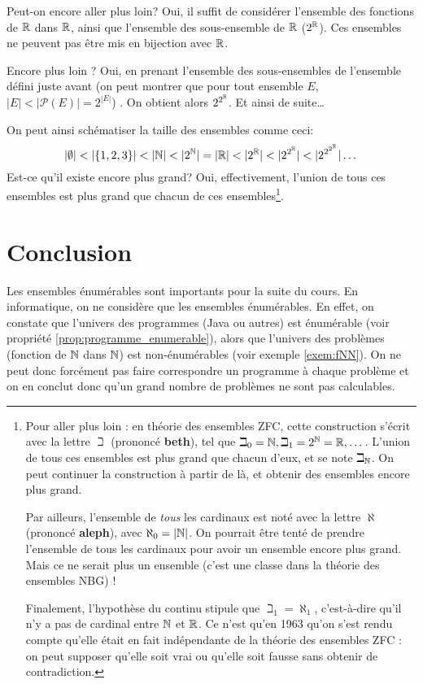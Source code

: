 Peut-on encore aller plus loin?  Oui,  il suffit de considérer  l'ensemble des fonctions de $\mathbb{R}$ dans $\mathbb{R}$, ainsi que
l'ensemble des sous-ensemble de $\mathbb{R}$ ($2^{\mathbb{R}}$).  Ces ensembles ne peuvent pas être mis en bijection avec $\mathbb{R}$.

Encore plus loin ?  Oui, en prenant l'ensemble des sous-ensembles de l'ensemble défini juste avant (on peut montrer que pour tout ensemble $E$, $|E|<|\mathcal{P}(E)|=2^{|E|}$) .  On obtient alors $2^{2^{\mathbb{R}}}$.  Et ainsi de suite\ldots

On peut ainsi schématiser la taille des ensembles comme ceci:
$$|\emptyset| < |\{1,2,3\}| < |\mathbb{N}| < |2^{\mathbb{N}}| = |\mathbb{R}| < |2^{\mathbb{R}}| < |2^{2^{\mathbb{R}}}| < |2^{2^{2^{\mathbb{R}}}}| \dots$$
Est-ce qu'il existe encore plus grand? Oui, effectivement, l'union de tous ces ensembles
est plus grand que chacun de ces ensembles\footnote{
Pour aller plus loin : en théorie des ensembles ZFC, cette construction s'écrit avec la lettre $\beth$ (prononcé \textbf{beth}), tel que $\beth_0 = \mathbb{N}, \beth_1 = 2^{\mathbb{N}} = \mathbb{R},\dots$. L'union de tous ces ensembles est plus grand que chacun d'eux, et se note $\beth_{\mathbb{N}}$. On peut continuer la construction à partir de là, et obtenir des ensembles encore plus grand.

Par ailleurs, l'ensemble de \emph{tous} les cardinaux est noté avec la lettre $\aleph$ (prononcé \textbf{aleph}), avec $\aleph_0 = \left\lvert\mathbb{N}\right\lvert$. On pourrait être tenté de prendre l'ensemble de tous les cardinaux pour avoir un ensemble encore plus grand. Mais ce ne serait plus un ensemble (c'est une classe dans la théorie des ensembles NBG) !

Finalement, l'hypothèse du continu stipule que $\beth_1 = \aleph_1$, c'est-à-dire qu'il n'y a pas de cardinal entre $\mathbb{N}$ et $\mathbb{R}$. Ce n'est qu'en 1963 qu'on s'est rendu compte qu'elle était en fait indépendante de la théorie des ensembles ZFC : on peut supposer qu'elle soit vrai ou qu'elle soit fausse sans obtenir de contradiction.}.

\section{Conclusion}
\label{sec:concept_conclusion}

Les ensembles énumérables sont importants pour la suite du cours. En
informatique, on ne considère que les ensembles énumérables. En effet, on constate que l'univers des programmes (Java ou autres) est énumérable (voir propriété \ref{prop:programme_enumerable}), alors que l'univers des problèmes (fonction de $\mathbb{N}$ dans $\mathbb{N}$) est non-énumérables (voir exemple \ref{exem:fNN}).
On ne peut donc forcément pas faire correspondre un programme à chaque problème et on en conclut donc qu'un grand nombre de problèmes ne sont pas calculables.

